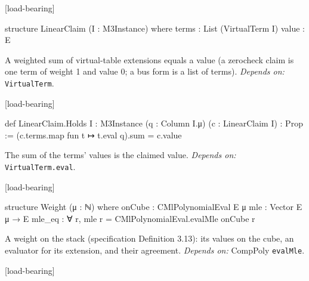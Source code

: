 \par\medskip\noindent\textbf{}\hfill\textsf{\small [load-bearing]}\par\nopagebreak

\begin{leancode}
structure LinearClaim (I : M3Instance) where
  terms : List (VirtualTerm I)
  value : E
\end{leancode}


A weighted sum of virtual-table extensions equals a value (a zerocheck claim is one term of weight 1 and value 0; a bus form is a list of terms). \emph{Depends on:} \texttt{VirtualTerm}.

\par\medskip\noindent\textbf{}\hfill\textsf{\small [load-bearing]}\par\nopagebreak

\begin{leancode}
def LinearClaim.Holds {I : M3Instance} (q : Column I.μ) (c : LinearClaim I) : Prop :=
  (c.terms.map fun t ↦ t.eval q).sum = c.value
\end{leancode}


The sum of the terms' values is the claimed value. \emph{Depends on:} \texttt{VirtualTerm.\allowbreak{}eval}.

\par\medskip\noindent\textbf{}\hfill\textsf{\small [load-bearing]}\par\nopagebreak

\begin{leancode}
structure Weight (μ : ℕ) where
  onCube : CMlPolynomialEval E μ
  mle : Vector E μ → E
  mle_eq : ∀ r, mle r = CMlPolynomialEval.evalMle onCube r
\end{leancode}


A weight on the stack (specification Definition 3.13): its values on the cube, an evaluator for its extension, and their agreement. \emph{Depends on:} CompPoly \texttt{evalMle}.

\par\medskip\noindent\textbf{}\hfill\textsf{\small [load-bearing]}\par\nopagebreak

